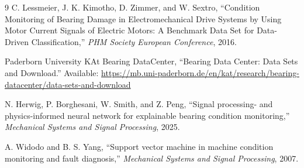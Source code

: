 \documentclass[11pt,a4paper]{article}
\begin{document}
\begin{thebibliography}{9}
C. Lessmeier, J. K. Kimotho, D. Zimmer, and W. Sextro, ``Condition Monitoring of Bearing Damage in Electromechanical Drive Systems by Using Motor Current Signals of Electric Motors: A Benchmark Data Set for Data-Driven Classification,'' \textit{PHM Society European Conference}, 2016.

Paderborn University KAt Bearing DataCenter, ``Bearing Data Center: Data Sets and Download.'' Available: \url{https://mb.uni-paderborn.de/en/kat/research/bearing-datacenter/data-sets-and-download}

N. Herwig, P. Borghesani, W. Smith, and Z. Peng, ``Signal processing- and physics-informed neural network for explainable bearing condition monitoring,'' \textit{Mechanical Systems and Signal Processing}, 2025.

A. Widodo and B. S. Yang, ``Support vector machine in machine condition monitoring and fault diagnosis,'' \textit{Mechanical Systems and Signal Processing}, 2007.
\end{thebibliography}
\end{document}
